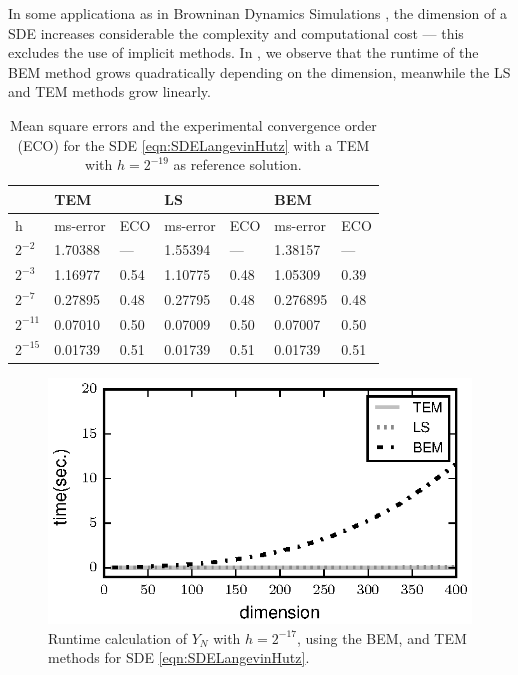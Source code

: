 \begin{example}
		In some applicationa as in Browninan Dynamics Simulations \cite{Cruz2012}, the dimension of a SDE
	increases considerable the complexity and computational cost --- this excludes the use of implicit methods.
	In , we observe that the runtime of the BEM method grows quadratically depending
	on the dimension, meanwhile the LS and TEM methods grow linearly. 
	\begin{table}[t]
		\centering
		\begin{tabular}{lllllll}
			&        TEM &        	& LS		&           & BEM		 &         \\
			\toprule
			h		& ms-error	 & ECO 		& ms-error	    & ECO		& ms-error	 &	ECO	  \\
			\midrule
			$2^{-2}$	& \num{1.70388}    & ---		&\num{1.55394}		& ---		& \num{1.38157}	& 
			--- \\
			$2^{-3}$	& \num{1.16977}    & \num{0.54}     &\num{1.10775}    & \num{0.48} & \num{1.05309}	& 
			\num{0.39} \\ 
			$2^{-7}$	&\num{0.27895}     & \num{0.48} & \num{0.27795}   & \num{0.48} & \num{0.276895}& 
			\num{0.48} \\
			$2^{-11}$	& \num{0.07010}  & \num{0.50} & \num{0.07009}  & \num{0.50} & \num{0.07007} & 
			\num{0.50} \\
			$2^{-15}$	& \num{0.01739}  & \num{0.51} & \num{0.01739}  & \num{0.51} & \num{0.01739}& 
			\num{0.51} \\
			\bottomrule
		\end{tabular}
		\caption{
			Mean square errors and the experimental convergence order (ECO) for the SDE \eqref{eqn:SDELangevinHutz} 
			with a TEM with $h = 2^{-19}$ as reference solution.
		}\label{tbl:OrdersLS}
	\end{table}
	\begin{figure}[t]
		\centering
			\includegraphics{./papers/paperB/figures/TimeVsDimension}
		\caption{
			Runtime calculation of $Y_N$ with $h=2^{-17}$, using the BEM,  \SM and TEM methods for 
			SDE \eqref{eqn:SDELangevinHutz}.
		}
		\label{fig:TimeVsDimension}
	\end{figure}
\end{example}

